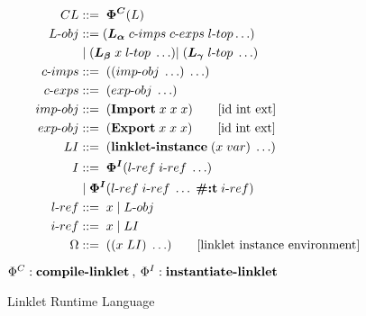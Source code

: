 \documentclass[sigplan,screen,anonymous]{acmart}
\def\dash {\text{-}}
\begin{document}
\begin{figure}[tbp]
  \begin{align*}
    CL             &::=\; \bm{\Phi^C}(L)\\
    L\dash obj     &::= (\la\; c\dash imps \; c\dash exps \; l\dash top \ldots)\\
    \;           &\;|\; (\lb\; x\; l\dash top\; \ldots) |\; (\lc\; l\dash top\; \ldots) \\
    c\dash imps    &::=\; ((imp\dash obj\; \ldots)\; \ldots)\\
    c\dash exps    &::=\; (exp\dash obj\; \ldots)\\
    imp\dash obj   &::=\; (\textbf{Import}\; x\; x\; x) \tag*{[id int ext]} \\
    exp\dash obj   &::=\; (\textbf{Export}\; x\; x\; x) \tag*{[id int ext]} \\
    LI             &::=\; (\textbf{linklet\dash instance}\; (x\; var)\; \ldots) \\
    I              &::=\; \bm{\Phi^I}(l\dash ref\; i\dash ref\; \ldots) \\
    \;           &\;|\; \bm{\Phi^I}(l\dash ref\; i\dash ref\; \ldots\; \textbf{\#:t}\; i\dash ref) \\
    l\dash ref &::=\; x\; |\; L\dash obj \\
    i\dash ref  &::=\; x\; |\; LI \\
    \Omega              &::=\; ((x\; LI)\; \ldots) \tag*{[linklet instance environment]} \\
  \end{align*}
  \hfill \footnotesize $\Phi^C : \textbf{compile\dash linklet}\:,\: \Phi^I : \textbf{instantiate\dash linklet}$
\caption{Linklet Runtime Language}
\label{fig:linklet-runtime}
\end{figure}
\end{document}
